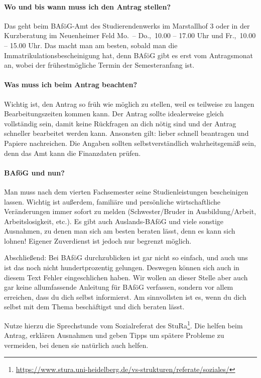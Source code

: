 \paragraph{Wo und bis wann muss ich den Antrag stellen?}
Das geht beim BAföG-Amt des Studierendenwerks im Marstallhof 3 oder in der Kurzberatung im Neuenheimer Feld Mo.\ -- Do.,\ 10.00 -- 17.00 Uhr und Fr.,\ 10.00 -- 15.00 Uhr. Das macht man am besten, sobald man die Immatrikulationsbescheinigung hat, denn BAföG gibt es erst vom Antragsmonat an, wobei der frühestmögliche Termin der Semesteranfang ist.

\paragraph{Was muss ich beim Antrag beachten?}
Wichtig ist, den Antrag so früh wie möglich zu stellen, weil es teilweise zu langen Bearbeitungszeiten kommen kann. Der Antrag sollte idealerweise gleich vollständig sein, damit keine Rückfragen an dich nötig sind und der Antrag schneller bearbeitet werden kann. Ansonsten gilt: lieber schnell beantragen und Papiere nachreichen. Die Angaben sollten selbstverständlich wahrheitsgemäß sein, denn das Amt kann die Finanzdaten prüfen.

\paragraph{BAföG und nun?}
Man muss nach dem vierten Fachsemester seine Studienleistungen bescheinigen lassen. Wichtig ist außerdem,  familiäre und persönliche wirtschaftliche Veränderungen immer sofort zu melden (Schwester/Bruder in Ausbildung/Arbeit, Arbeitslosigkeit, etc.). Es gibt auch Auslands-BAföG und viele sonstige Ausnahmen, zu denen man sich am besten beraten lässt, denn es kann sich lohnen! Eigener Zuverdienst ist jedoch nur begrenzt möglich.

\noindent Abschließend: Bei BAföG durchzublicken ist gar nicht so einfach, und auch uns ist das noch nicht hundertprozentig gelungen. Deswegen können sich auch in diesem Text Fehler eingeschlichen haben. Wir wollen an dieser Stelle aber auch gar keine allumfassende Anleitung für BAföG verfassen, sondern vor allem erreichen, dass du dich selbst informierst. Am sinnvollsten ist es, wenn du dich selbst mit dem Thema beschäftigst und dich beraten lässt.

Nutze hierzu die Sprechstunde vom Sozialreferat des \gls{StuRa}\footnote{\url{https://www.stura.uni-heidelberg.de/vs-strukturen/referate/soziales/}}. Die helfen beim Antrag, erklären Ausnahmen und geben Tipps um spätere Probleme zu vermeiden, bei denen sie natürlich auch helfen.
